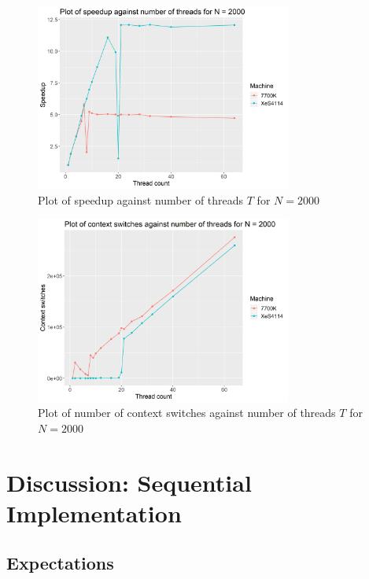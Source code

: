 \documentclass[12pt]{article}
\begin{document}
\begin{figure}[H]
    \centering
    \includegraphics[width=0.75\textwidth]{par-2000N-speedup}
    \caption{Plot of speedup against number of threads $T$ for $N = 2000$}
    \label{fig:par-2000N-speedup}
\end{figure}

\begin{figure}[H]
    \centering
    \includegraphics[width=0.75\textwidth]{par-2000N-contextSwitches}
    \caption{Plot of number of context switches against number of threads $T$ for $N = 2000$}
    \label{fig:par-2000N-contextSwitches}
\end{figure}

\pagebreak

\section{Discussion: Sequential Implementation}

\subsection{Expectations} \label{seq-expect}
\end{document}
